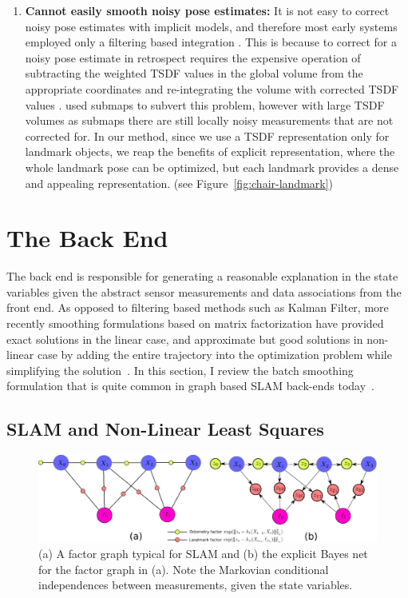 \begin{enumerate}
    \item \textbf{Cannot easily smooth noisy pose estimates:} It is not easy to correct noisy pose estimates with implicit models, and therefore most early systems employed only a filtering based integration \cite{newcombeKinectFusionRealtimeDense2011}. This is because to correct for a noisy pose estimate in retrospect requires the expensive operation of subtracting the weighted TSDF values in the global volume from the appropriate coordinates and re-integrating the volume with corrected TSDF values \cite{daiBundleFusionRealtimeGlobally2017}. \cite{whelanKintinuousSpatiallyExtended} used submaps to subvert this problem, however with large TSDF volumes as submaps there are still locally noisy measurements that are not corrected for. In our method, since we use a TSDF representation only for landmark objects, we reap the benefits of explicit representation, where the whole landmark pose can be optimized, but each landmark provides a dense and appealing representation. (see Figure~\ref{fig:chair-landmark})
\end{enumerate}

\section{The Back End}

The back end is responsible for generating a reasonable explanation in the state variables given the abstract sensor measurements and data associations from the front end. As opposed to filtering based methods such as Kalman Filter, more recently smoothing formulations based on matrix factorization have provided exact solutions in the linear case, and approximate but good solutions in non-linear case by adding the entire trajectory into the optimization problem while simplifying the solution~\cite{kaessIncrementalSmoothingMapping}. In this section, I review the batch smoothing formulation that is quite common in graph based SLAM back-ends today~\cite{grisettiTutorialGraphBasedSLAM, dellaertFactorGraphsRobot2017}.

\subsection{SLAM and Non-Linear Least Squares}

\begin{figure}[htpb]
    \centering
    \includegraphics[width=\linewidth]{figs/factor-graph-background}
    \caption{(a) A factor graph typical for SLAM and (b) the explicit Bayes net for the factor graph in (a). Note the Markovian conditional independences between measurements, given the state variables.}%
    \label{fig:factor-graph}
\end{figure}

